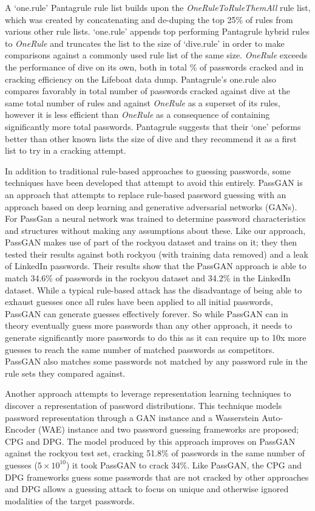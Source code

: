 \documentclass[letterpaper,twocolumn,10pt]{article}
\begin{document}
A `one.rule' Pantagrule rule list builds upon the \textit{OneRuleToRuleThemAll}
rule list, which was created by concatenating and de-duping the top 25\% of
rules from various other rule lists.\cite{ortrta} `one.rule' appends top
performing Pantagrule hybrid rules to \textit{OneRule} and truncates the list
to the size of `dive.rule' in order to make comparisons against a commonly used
rule list of the same size.
\textit{OneRule} exceeds the performance of dive on its own, both in total \%
of passwords cracked and in cracking efficiency on the Lifeboat data dump.
Pantagrule's one.rule also compares favorably in total number of passwords
cracked against dive at the same total number of rules and against
\textit{OneRule} as a superset of its rules, however it is less efficient than
\textit{OneRule} as a consequence of containing significantly more total
passwords. Pantagrule suggests that their `one' peforms better than other known
lists the size of dive and they recommend it as a first list to try in a
cracking attempt.


In addition to traditional rule-based approaches to guessing passwords, some
techniques have been developed that attempt to avoid this entirely.
PassGAN\cite{hitaj2019passgan} is an approach that attempts to replace
rule-based password guessing with an approach based on deep learning and
generative adversarial networks (GANs). For PassGan a neural network was
trained to determine password characteristics and structures without making any
assumptions about these. Like our approach, PassGAN makes use of part of the
rockyou dataset and trains on it; they then tested their results against both
rockyou (with training data removed) and a leak of LinkedIn passwords. Their
results show that the PassGAN approach is able to match 34.6\% of passwords in
the rockyou dataset and 34.2\% in the LinkedIn dataset. While a typical
rule-based attack has the disadvantage of being able to exhaust guesses once
all rules have been applied to all initial passwords, PassGAN can generate
guesses effectively forever. So while PassGAN can in theory eventually guess
more passwords than any other approach, it needs to generate significantly more
passwords to do this as it can require up to 10x more guesses to reach the same
number of matched passwords as competitors. PassGAN also matches some passwords
not matched by any password rule in the rule sets they compared against.

Another approach\cite{pasquini2021improving} attempts to leverage
representation learning techniques to discover a representation of password
distributions. This technique models password representation through a GAN
instance and a Wasserstein Auto-Encoder (WAE) instance and two password guessing
frameworks are proposed; CPG and DPG. The model produced by this approach
improves on PassGAN against the rockyou test set, cracking 51.8\% of passwords
in the same number of guesses ($5 \times 10^{10}$) it took PassGAN to crack 34\%.
Like PassGAN, the CPG and DPG frameworks guess some passwords that are not
cracked by other approaches and DPG allows a guessing attack to focus on unique
and otherwise ignored modalities of the target passwords.
\end{document}
